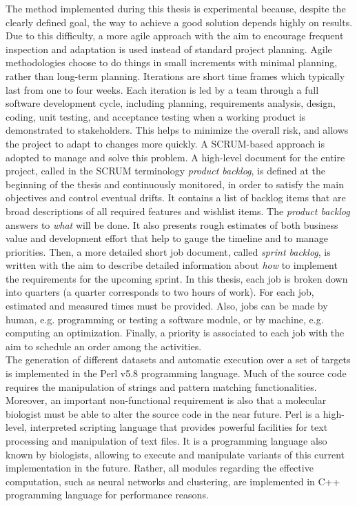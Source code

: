 The method implemented during this thesis is experimental because, despite the clearly defined goal, the way to achieve a good solution depends highly on results. Due to this difficulty, a more agile approach with the aim to encourage frequent inspection and adaptation is used instead of standard project planning. Agile methodologies choose to do things in small increments with minimal planning, rather than long-term planning. Iterations are short time frames which typically last from one to four weeks. Each iteration is led by a team through a full software development cycle, including planning, requirements analysis, design, coding, unit testing, and acceptance testing when a working product is demonstrated to stakeholders. This helps to minimize the overall risk, and allows the project to adapt to changes more quickly. A SCRUM-based approach is adopted to manage and solve this problem. A high-level document for the entire project, called in the SCRUM terminology \emph{product backlog}, is defined at the beginning of the thesis and continuously monitored, in order to satisfy the main objectives and control eventual drifts. It contains a list of backlog items that are broad descriptions of all required features and wishlist items. The \emph{product backlog} answers to \emph{what} will be done. It also presents rough estimates of both business value and development effort that help to gauge the timeline and to manage priorities. Then, a more detailed short job document, called \emph{sprint backlog}, is written with the aim to describe detailed information about \emph{how} to implement the requirements for the upcoming sprint. In this thesis, each job is broken down into quarters (a quarter corresponds to two hours of work). For each job, estimated and measured times must be provided. Also, jobs can be made by human, e.g. programming or testing a software module, or by machine, e.g. computing an optimization. Finally, a priority is associated to each job with the aim to schedule an order among the activities. \\
The generation of different datasets and automatic execution over a set of targets is implemented in the Perl v5.8 programming language. Much of the source code requires the manipulation of strings and pattern matching functionalities. Moreover, an important non-functional requirement is also that a molecular biologist must be able to alter the source code in the near future. Perl is a high-level, interpreted scripting language that provides powerful facilities for text processing and manipulation of text files. It is a programming language also known by biologists, allowing to execute and manipulate variants of this current implementation in the future. Rather, all modules regarding the effective computation, such as neural networks and clustering, are implemented in C++ programming language for performance reasons. \\
